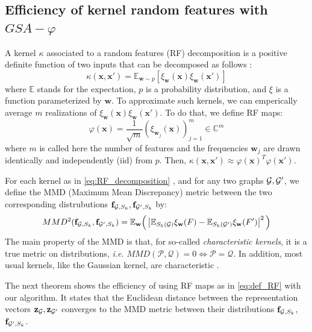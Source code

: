 \documentclass{article}
\begin{document}
\subsection{Efficiency of kernel random features with $GSA-\varphi$} 
\label{sec:MMD}
A kernel $\kappa$ associated to a random features (RF) decomposition is a positive definite function of two inputs that can be decomposed  as follows   \cite{rahimi2008random}:
\begin{equation}
\label{eq:RF_decomposition}
\kappa(\mathbf{x},\mathbf{x}')=\mathbb{E}_{\mathbf{w}\sim p}[ \xi_\mathbf{w}(\mathbf{x}) \xi_\mathbf{w}(\mathbf{x}')]
\end{equation}
where $\mathbb{E}$ stands for the expectation, $p$ is a probability distribution, and $\xi$ is a function parameterized by $\mathbf{w}$. 
To approximate such kernels, we can emperically average $m$ realizations of $\xi_\mathbf{w}(\mathbf{x}) \xi_\mathbf{w}(\mathbf{x}')$. To do that, we define RF maps:
\begin{equation}
	\label{eq:def_RF}
	\varphi(\mathbf{x}) = \frac{1}{\sqrt{m}} ( \xi_{\mathbf{w}_j}(\mathbf{x}) )_{j=1}^m \in \mathbb{C}^m
\end{equation}
where  $m$ is called here the number of features and the frequencies $\mathbf{w}_j$ are drawn identically and independently (iid) from $p$. Then, $\kappa(\mathbf{x},\mathbf{x}')\approx	\varphi(\mathbf{x})^T	\varphi(\mathbf{x}')$.

 For each kernel as in  \eqref{eq:RF_decomposition} , and for any two graphs $\mathcal{G},\mathcal{G}'$, we define the MMD (Maximum Mean Discrepancy) metric between the two corresponding distrubutions  $\mathbf{f}_{\mathcal{G},S_k}, \mathbf{f}_{\mathcal{G}',S_k}$ by:
 \[
 MMD^2(\mathbf{f}_{\mathcal{G},S_k}, \mathbf{f}_{\mathcal{G}',S_k}) = \mathbb{E}_{\mathbf{w}} \Big( \left| \mathbb{E}_{S_k(\mathcal{G})} \xi_\mathbf{w}(F) - \mathbb{E}_{S_k(\mathcal{G}')} \xi_\mathbf{w}(F') \right|^2 \Big)
 \]
 The main property of the MMD is that, for so-called \emph{characteristic kernels}, it is a true metric on distributions, \emph{i.e.} $MMD(\mathcal{P}, \mathcal{Q}) = 0 \Leftrightarrow \mathcal{P} = \mathcal{Q}$. In addition, most usual kernels, like the Gaussian kernel, are characteristic \cite{MMD}.
 
 The next theorem shows the efficiency of using RF maps as in \eqref{eq:def_RF} with our algorithm. It states  that the Euclidean distance between the representation vectors $\mathbf{z}_{\mathcal{G}}, \mathbf{z}_{\mathcal{G}'}$ converges to the MMD metric between their distributions $\mathbf{f}_{\mathcal{G},S_k}$, $\mathbf{f}_{\mathcal{G}',S_k}$. 
\end{document}
